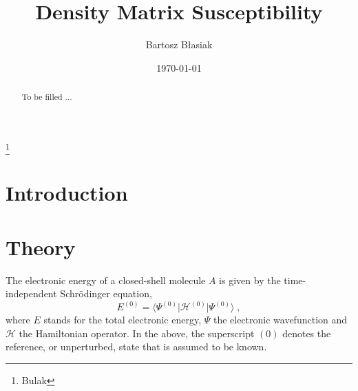 \documentclass[aip,graphicx]{revtex4-1}
\newcommand{\tbraket}[3]{\ensuremath{\bigl\langle {#1} \bigl\lvert {#2} \bigl\lvert {#3} \bigr\rangle}}
\begin{document}
\title{Density Matrix Susceptibility} %

\author{Bartosz B{\l}asiak}
\thanks{Bulak}

\date{\today}

\begin{abstract}
To be filled ...
\end{abstract}

\pacs{}%

\maketitle %

\section{\label{s:1}Introduction}

\section{\label{s:2}Theory}

The electronic energy of a closed\hyp{}shell molecule $A$ is given by the time\hyp{}independent Schr{\"o}dinger equation,
%
\begin{equation}
 E^{(0)} = \tbraket{\Psi^{(0)}}{\mathscr{H}^{(0)}}{\Psi^{(0)}} \;,
\end{equation}
%
where $E$ stands for the total electronic energy, $\Psi$ the electronic wavefunction and $\mathscr{H}$
the Hamiltonian operator. In the above, the superscript $(0)$
denotes the reference, or unperturbed, state that is assumed to be known.
\end{document}
